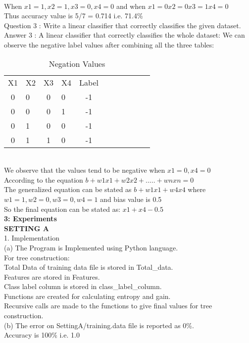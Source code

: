 \documentclass{article}
\begin{document}
\\When $x1=1, x2=1, x3=0, x4=0$ and when $x1=0 x2=0 x3=1 x4=0$
\\Thus accuracy value is 5/7 = 0.714 i.e. 71.4\%
\\[10pt]
Question 3 : Write a linear classifier that correctly classifies the given dataset.
\\[10pt]
Answer 3 : A linear classifier that correctly classifies the whole dataset:
We can observe the negative label values after combining all the three tables:
\begin{table}[h]
\centering
\caption{Negation Values}
\begin{tabular} {clclclclclc}
X1 & X2 & X3 & X4 & Label \\
  0 & 0 & 0 & 0 & -1 \\
  0 & 0 & 0 & 1 & -1 \\
  0 & 1 & 0 & 0 & -1 \\
  0 & 1 & 1 & 0 & -1 \\
  \end{tabular}
\end{table}
\\[10pt]
We observe that the values tend to be negative when $x1=0, x4=0$
\\According to the equation $b + w1x1 + w2x2 +.....+ wnxn=0$
\\The generalized equation can be stated as
$b + w1x1 + w4x4$ where $w1=1, w2=0, w3=0, w4=1$ and bias value is 0.5
\\So the final equation can be stated as: $x1 + x4 - 0.5$
\\[10pt]
\textbf {3: Experiments}
\\[40pt]
\textbf {SETTING A}
\\
1. Implementation
\\(a) The Program is Implemented using Python language.
\\For tree construction:
\\Total Data of training data file is stored in Total\_data.
\\ Features are stored in Features. 
\\Class label column is stored in class\_label\_column. 
\\Functions are created for calculating entropy and gain. 
\\Recursive calls are made to the functions to give final values for tree construction.
\\(b) The error on SettingA/training.data file is reported as 0\%. \\Accuracy is 100\% i.e. 1.0
\end{document}
